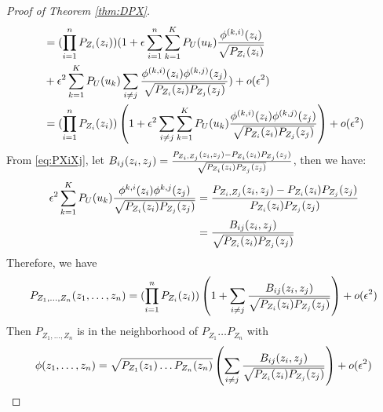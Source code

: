 \begin{proof}[Proof of Theorem \ref{thm:DPX}]
\begin{align*}
&= (\prod_{i=1}^n  P_{Z_i} (z_i))
(1+\epsilon\sum_{i=1}^n \sum_{k=1}^{K} P_U(u_k){\phi^{(k,i)}(z_i) \over \sqrt{P_{Z_i}(z_i)}} \\
&+\epsilon^2 \sum_{k=1}^{K} P_U(u_k)\sum_{i\neq j}{\phi^{(k,i)}(z_i)\phi^{(k,j)}(z_j)\over \sqrt{P_{Z_i}(z_i)P_{Z_j}(z_j)} } ) + o(\epsilon^2)\\
&= (\prod_{i=1}^n  P_{Z_i} (z_i))
\left(1 +\epsilon^2\sum_{i\neq j} \sum_{k=1}^{K}P_U(u_k){\phi^{(k,i)}(z_i)\phi^{(k,j)}(z_j)\over \sqrt{P_{Z_i}(z_i)P_{Z_j}(z_j)} }\right) + o(\epsilon^2)
\end{align*}
From \eqref{eq:PXiXj},
let $B_{ij}(z_i, z_j)={P_{Z_i, Z_j}(z_i,z_j) - P_{Z_i}(z_i)P_{Z_j}(z_j) \over \sqrt{P_{Z_i}(z_i)P_{Z_j}(z_j)}} $, then we have:
\begin{align}
\epsilon^2\sum_{k=1}^{K}P_U(u_k)
{\phi^{k,i}(z_i)\phi^{k,j}(z_j)\over \sqrt{P_{Z_i}(z_i)P_{Z_j}(z_j)} } & = {P_{Z_i, Z_j}(z_i, z_j) - P_{Z_i}(z_i)P_{Z_j}(z_j) \over P_{Z_i}(z_i)P_{Z_j}(z_j)} \notag\\
& = {B_{ij}(z_i, z_j) \over \sqrt{P_{Z_i}(z_i)P_{Z_j}(z_j)} } \label{eq:Bsecond}
\end{align}
Therefore, we have 
\begin{equation}\label{eq:sep}
P_{Z_1,\dots,Z_n}(z_1,\dots,z_n) =  (\prod_{i=1}^n  P_{Z_i} (z_i))\left ( 1 + \sum_{i\neq j}{B_{ij}(z_i, z_j) \over \sqrt{P_{Z_i}(z_i)P_{Z_j}(z_j)} }\right) +o(\epsilon^2)
\end{equation}
Then $P_{Z_1,\dots, Z_n}$ is in the neighborhood of $P_{Z_1}\dots P_{Z_n}$ with $$\phi(z_1,\dots, z_n)=
\sqrt{P_{Z_1}(z_1)\dots P_{Z_n}(z_n)}\left(\sum_{i\neq j}{B_{ij}(z_i, z_j) \over \sqrt{P_{Z_i}(z_i)P_{Z_j}(z_j)} }\right)+o(\epsilon^2)$$


\end{proof}
